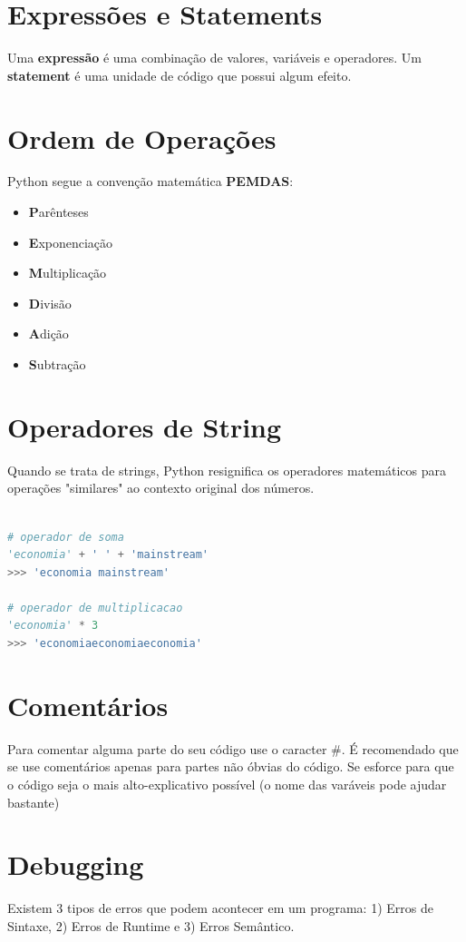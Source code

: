 \documentclass[a4paper,11pt]{book}
\begin{document}
\section{Expressões e Statements}
Uma \textbf{expressão} é uma combinação de valores, variáveis e operadores. Um \textbf{statement} é uma unidade de código que possui algum efeito.

\section{Ordem de Operações}
Python segue a convenção matemática \textbf{PEMDAS}:
\begin{itemize}
	\item \textbf{P}arênteses
	\item \textbf{E}xponenciação
	\item \textbf{M}ultiplicação
	\item \textbf{D}ivisão
	\item \textbf{A}dição
	\item \textbf{S}ubtração
\end{itemize}

\section{Operadores de String}
Quando se trata de strings, Python resignifica os operadores matemáticos para operações "similares" ao contexto original dos números.
\begin{lstlisting}[language=Python, caption=Atribuições para diferentes classes]

# operador de soma
'economia' + ' ' + 'mainstream'
>>> 'economia mainstream'

# operador de multiplicacao
'economia' * 3
>>> 'economiaeconomiaeconomia'

\end{lstlisting}

\section{Comentários}
Para comentar alguma parte do seu código use o caracter \#. É recomendado que se use comentários apenas para partes não óbvias do código. Se esforce para que o código seja o mais alto-explicativo possível (o nome das varáveis pode ajudar bastante)

\section{Debugging}
Existem 3 tipos de erros que podem acontecer em um programa: 1) Erros de Sintaxe, 2) Erros de Runtime e 3) Erros Semântico.
\end{document}
